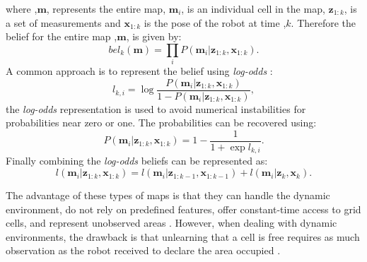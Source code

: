 where ,$\mathbf{m}$, represents the entire map, $\mathbf{m}_i$, is an individual cell in the map, $\mathbf{z}_{1:k}$, is a set of measurements and $\mathbf{x}_{1:k}$ is the pose of the robot at time ,$k$. Therefore the belief for the entire map ,$\mathbf{m}$, is given by:
\begin{equation}
    bel_{k}(\mathbf{m}) = \prod_{i}P(\mathbf{m}_i|\mathbf{z}_{1:k},\mathbf{x}_{1:k}).
\end{equation}
A common approach is to represent the belief using \textit{log-odds} \cite{Thrun2001b}:
\begin{equation}
l_{k,i} = \log \frac{P(\mathbf{m}_i|\mathbf{z}_{1:k},\mathbf{x}_{1:k})}{1-P(\mathbf{m}_i|\mathbf{z}_{1:k},\mathbf{x}_{1:k})},
\end{equation}
the \textit{log-odds} representation is used to avoid numerical instabilities for probabilities near zero or one. The probabilities can be recovered using:
\begin{equation}
P(\mathbf{m}_i|\mathbf{z}_{1:k},\mathbf{x}_{1:k}) = 1 - \frac{1}{1 + \exp {l_{k,i}}}.
\end{equation} 
Finally combining the \textit{log-odds} beliefs can be represented as:
\begin{equation}
    l(\mathbf{m}_i|\mathbf{z}_{1:k},\mathbf{x}_{1:k}) = l(\mathbf{m}_i|\mathbf{z}_{1:k-1},\mathbf{x}_{1:k-1}) + l(\mathbf{m}_i|\mathbf{z}_{k},\mathbf{x}_{k}). 
\end{equation}

The advantage of these types of maps is that they can handle the dynamic environment, do not rely on predefined features, offer constant-time access to grid cells, and represent unobserved areas \cite{Siciliano2008b, Saeedi}. However, when dealing with dynamic environments, the drawback is that unlearning that a cell is free requires as much observation as the robot received to declare the area occupied \cite{Siciliano2008b}.

